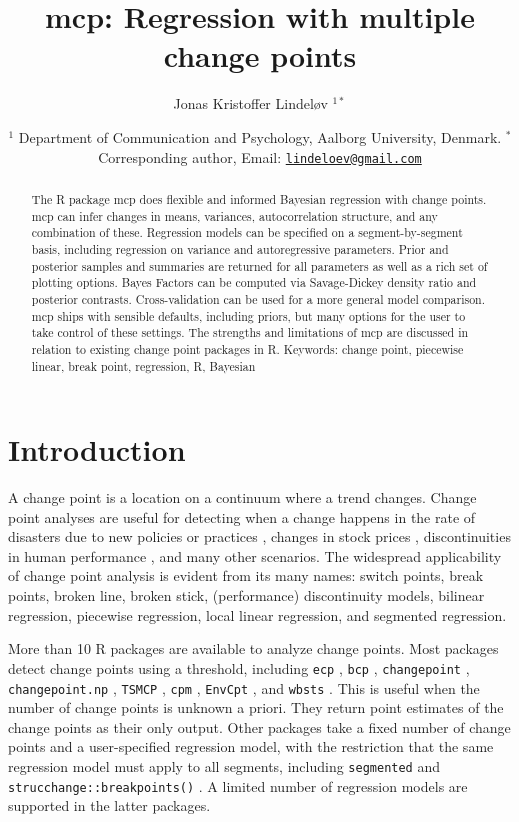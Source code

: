 \documentclass[
  american,
]{article}
\title{mcp: Regression with multiple change points}
\author{Jonas Kristoffer Lindeløv \(^{1*}\)}
\date{\(^1\) Department of Communication and Psychology, Aalborg University, Denmark.\break
\(^*\) Corresponding author, Email: \href{mailto:lindeloev@gmail.com}{\nolinkurl{lindeloev@gmail.com}}}
\begin{document}
\maketitle
\begin{abstract}
The R package mcp does flexible and informed Bayesian regression with change points. mcp can infer changes in means, variances, autocorrelation structure, and any combination of these. Regression models can be specified on a segment-by-segment basis, including regression on variance and autoregressive parameters. Prior and posterior samples and summaries are returned for all parameters as well as a rich set of plotting options. Bayes Factors can be computed via Savage-Dickey density ratio and posterior contrasts. Cross-validation can be used for a more general model comparison. mcp ships with sensible defaults, including priors, but many options for the user to take control of these settings. The strengths and limitations of mcp are discussed in relation to existing change point packages in R.
\linebreak\linebreak
Keywords: change point, piecewise linear, break point, regression, R, Bayesian
\end{abstract}

\hypertarget{introduction}{%
\section{Introduction}\label{introduction}}

A change point is a location on a continuum where a trend changes. Change point analyses are useful for detecting when a change happens in the rate of disasters due to new policies or practices \citep{raftery1986}, changes in stock prices \citep{chen1997a}, discontinuities in human performance \citep{cowan2000}, and many other scenarios. The widespread applicability of change point analysis is evident from its many names: switch points, break points, broken line, broken stick, (performance) discontinuity models, bilinear regression, piecewise regression, local linear regression, and segmented regression.

More than 10 R packages are available to analyze change points. Most packages detect change points using a threshold, including \texttt{ecp} \citep{james2015}, \texttt{bcp} \citep{erdman2007}, \texttt{changepoint} \citep{killick2014}, \texttt{changepoint.np} \citep{haynes2019}, \texttt{TSMCP} \citep{li2018}, \texttt{cpm} \citep{ross2015}, \texttt{EnvCpt} \citep{killick2018}, and \texttt{wbsts} \citep{korkas2018}. This is useful when the number of change points is unknown a priori. They return point estimates of the change points as their only output. Other packages take a fixed number of change points and a user-specified regression model, with the restriction that the same regression model must apply to all segments, including \texttt{segmented} \citep{muggeo2008} and \texttt{strucchange::breakpoints()} \citep{zeileis2003}. A limited number of regression models are supported in the latter packages.
\end{document}
